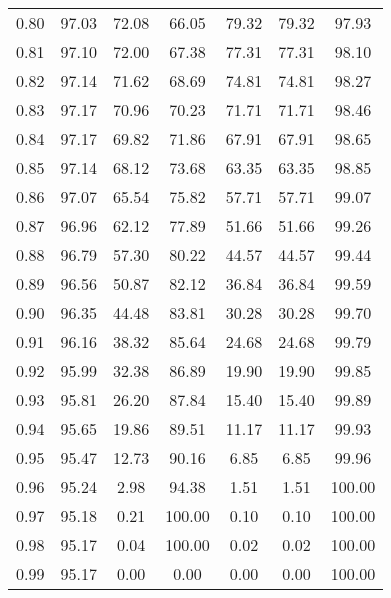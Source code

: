 \begin{tabular}{|c|c|c|c|c|c|c|}
      0.80 &     97.03 &     72.08 &      66.05 &   79.32 &      79.32 &         97.93 \\
      0.81 &     97.10 &     72.00 &      67.38 &   77.31 &      77.31 &         98.10 \\
      0.82 &     97.14 &     71.62 &      68.69 &   74.81 &      74.81 &         98.27 \\
      0.83 &     97.17 &     70.96 &      70.23 &   71.71 &      71.71 &         98.46 \\
      0.84 &     97.17 &     69.82 &      71.86 &   67.91 &      67.91 &         98.65 \\
      0.85 &     97.14 &     68.12 &      73.68 &   63.35 &      63.35 &         98.85 \\
      0.86 &     97.07 &     65.54 &      75.82 &   57.71 &      57.71 &         99.07 \\
      0.87 &     96.96 &     62.12 &      77.89 &   51.66 &      51.66 &         99.26 \\
      0.88 &     96.79 &     57.30 &      80.22 &   44.57 &      44.57 &         99.44 \\
      0.89 &     96.56 &     50.87 &      82.12 &   36.84 &      36.84 &         99.59 \\
      0.90 &     96.35 &     44.48 &      83.81 &   30.28 &      30.28 &         99.70 \\
      0.91 &     96.16 &     38.32 &      85.64 &   24.68 &      24.68 &         99.79 \\
      0.92 &     95.99 &     32.38 &      86.89 &   19.90 &      19.90 &         99.85 \\
      0.93 &     95.81 &     26.20 &      87.84 &   15.40 &      15.40 &         99.89 \\
      0.94 &     95.65 &     19.86 &      89.51 &   11.17 &      11.17 &         99.93 \\
      0.95 &     95.47 &     12.73 &      90.16 &    6.85 &       6.85 &         99.96 \\
      0.96 &     95.24 &      2.98 &      94.38 &    1.51 &       1.51 &        100.00 \\
      0.97 &     95.18 &      0.21 &     100.00 &    0.10 &       0.10 &        100.00 \\
      0.98 &     95.17 &      0.04 &     100.00 &    0.02 &       0.02 &        100.00 \\
      0.99 &     95.17 &      0.00 &       0.00 &    0.00 &       0.00 &        100.00 \\
\bottomrule
\end{tabular}
